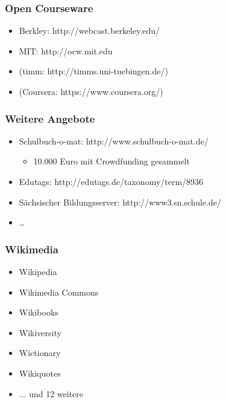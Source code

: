 \documentclass[table]{beamer}
\begin{document}
\begin{frame}
    \frametitle{Open Courseware}
      \begin{itemize}
        \item<2-> Berkley: http://webcast.berkeley.edu/
        \item<3-> MIT: http://ocw.mit.edu
        \item<4-> (timm: http://timms.uni-tuebingen.de/)
        \item<5-> (Coursera: https://www.coursera.org/)
    \end{itemize}
\end{frame}

\begin{frame}
    \frametitle{Weitere Angebote}
    \begin{itemize}
        \item<2-> Schulbuch-o-mat: http://www.schulbuch-o-mat.de/
            \begin{itemize}
                \item<3-> 10.000 Euro mit Crowdfunding gesammelt
            \end{itemize}
        \item<4-> Edutags: http://edutags.de/taxonomy/term/8936
        \item<5-> Sächsischer Bildungsserver: http://www3.sn.schule.de/
        \item<6-> \ldots
    \end{itemize}
\end{frame}

\begin{frame}
    \frametitle{Wikimedia}
    \begin{itemize}
      \item<2-> Wikipedia
      \item<3-> Wikimedia Commons
      \item<4-> Wikibooks
      \item<5-> Wikiversity
      \item<6-> Wictionary
      \item<7-> Wikiquotes
      \item<8-> ... und 12 weitere
    \end{itemize}
\end{frame}
\end{document}
